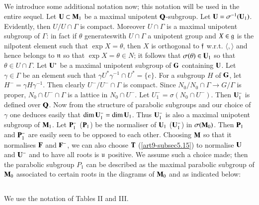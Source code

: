 \subsection{}\label{art9-subsec5.23}
We introduce some additional notation now; this notation will be used in the entire sequel. Let $\mathbf{U} \subset \mathbf{M}_1$ be a maximal unipotent $\mathbf{Q}$-subgroup. Let $\mathbf{U} = \sigma^{-1} (\mathbf{U}_1)$. Evidently, then $U/U \cap \Gamma$ is compact. Moreover $U \cap \Gamma$ is a maximal unipotent subgroup of $\Gamma$: in fact if $\theta$ generates\pageoriginale with $U \cap \Gamma$ a unipotent group and $X \in \mathfrak{g}$ is the nilpotent element such that $\exp X = \theta$, then $X$ is orthogonal to $\mathfrak{f}$ w.r.t. $\langle , \rangle$ and hence belongs to $\mathfrak{n}$ so that $\exp X = \theta \in N$; it follows that $\sigma (\theta) \in \mathbf{U}_1$ so that $\theta \in U \cap \Gamma$. Let $\mathbf{U}^\ast$ be a maximal unipotent subgroup of $\mathbf{G}$ containing $\mathbf{U}$. Let $\gamma \in \Gamma$ be an element such that $\gamma U^\ast \gamma^{-1} \cap U^{\ast} = \{e\}$. For a subgroup $H$ of $\mathbf{G}$, let $H^-= \gamma H \gamma^{-1}$. Then clearly $U^-/ U^- \cap \Gamma$ is compact. Since $N_0 / N_0 \cap \Gamma \to G/ \Gamma$  is proper, $N_0 \cap U^- \cap \Gamma$ is a lattice in $N_0 \cap U^-$. Let $U^-_1 = \sigma(N_0 \cap U^-)$. Then $\mathbf{U}^-_1$ is defined over $\mathbf{Q}$. Now from the structure of parabolic subgroups and our choice of $\gamma$ one deduces easily that $\dim \mathbf{U}^-_1 =\dim \mathbf{U}_1$. Thus $\mathbf{U}^-_1$ is also a maximal unipotent subgroup of $\mathbf{M}_1$. Let $\mathbf{P}^-_1$ (\resp $\mathbf{P}_1$) be the normaliser of $\mathbf{U}_1$ (\resp $\mathbf{U}^-_1$) in $\sigma (\mathbf{M}_0)$. Then $\mathbf{P}_1$ and $\mathbf{P}^-_1$ are easily seen to be opposed to each other. Choosing $\mathbf{M}$ so that it normalises $\mathbf{F}$ and $\mathbf{F}^-$, we can also choose $\mathbf{T}$ (\cf \ref{art9-subsec5.15}) to normalise $\mathbf{U}$ and $\mathbf{U}^-$ and to have all roots is $\mathfrak{u}$ positive. We assume such a choice made; then the parabolic subgroup $P_1$ can be described as the maximal parabolic subgroup of $\mathbf{M}_0$ associated to certain roots in the diagrams of $\mathbf{M}_0$ and as indicated below:

\subsection{}\label{art9-subsec5.24}
We use the notation of Tables II and III.

